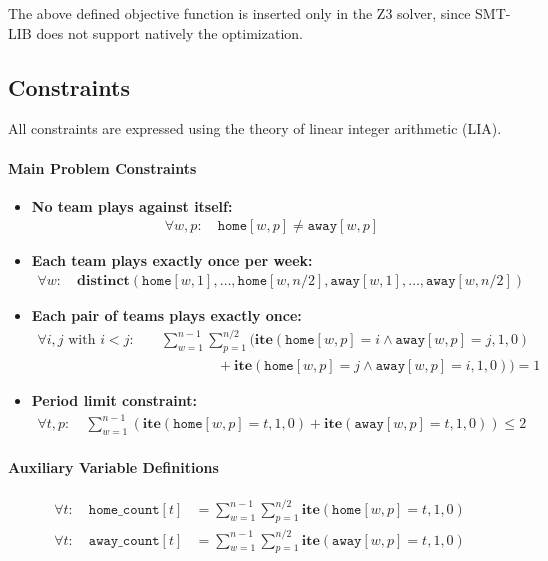 \documentclass[11pt]{article}
\begin{document}
The above defined objective function is inserted only in the Z3 solver, since SMT-LIB does not support natively the optimization.

\subsection{Constraints}

All constraints are expressed using the theory of linear integer arithmetic (LIA).

\paragraph{Main Problem Constraints}
\begin{itemize}
    \item \textbf{No team plays against itself:}
    \begin{align}
        \forall w, p: \quad \texttt{home}[w,p] \neq \texttt{away}[w,p]
    \end{align}

    \item \textbf{Each team plays exactly once per week:}
    \begin{align}
        \forall w: \quad
        \textbf{distinct}(\texttt{home}[w,1], \ldots, \texttt{home}[w,n/2], \texttt{away}[w,1], \ldots, \texttt{away}[w,n/2])
    \end{align}

    \item \textbf{Each pair of teams plays exactly once:}
    \begin{align}
        \forall i, j \text{ with } i < j: \quad
        &\sum_{w=1}^{n-1} \sum_{p=1}^{n/2} \Big( \textbf{ite}(\texttt{home}[w,p] = i \land \texttt{away}[w,p] = j, 1, 0) \nonumber \\
        &\qquad\qquad + \textbf{ite}(\texttt{home}[w,p] = j \land \texttt{away}[w,p] = i, 1, 0) \Big) = 1
    \end{align}

    \item \textbf{Period limit constraint:}
    \begin{align}
        \forall t, p: \quad
        \sum_{w=1}^{n-1} \left( \textbf{ite}(\texttt{home}[w,p] = t, 1, 0) + \textbf{ite}(\texttt{away}[w,p] = t, 1, 0) \right) \leq 2
    \end{align}
\end{itemize}

\paragraph{Auxiliary Variable Definitions}
\begin{align}
\forall t: \quad \texttt{home\_count}[t] &= \sum_{w=1}^{n-1} \sum_{p=1}^{n/2} \textbf{ite}(\texttt{home}[w,p] = t, 1, 0) \\
\forall t: \quad \texttt{away\_count}[t] &= \sum_{w=1}^{n-1} \sum_{p=1}^{n/2} \textbf{ite}(\texttt{away}[w,p] = t, 1, 0)
\end{align}
\end{document}

